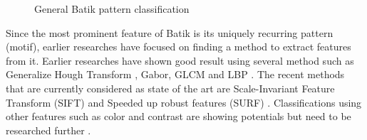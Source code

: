 \documentclass[conference, compsoc]{IEEEtran}
\begin{document}
\begin{figure}[!t]
\centering
{}
\hfil
{}
\hfil
{}
\hfil
{}
\hfil
{}
\caption{General Batik pattern classification}
\label{fig_batik_motifs}
\end{figure}

Since the most prominent feature of Batik is its uniquely recurring pattern (motif), earlier researches have focused on finding a method to extract features from it. Earlier researches have shown good result using several method such as Generalize Hough Transform \cite{sanabila2009recognition}, Gabor, GLCM and LBP \cite{fahmi2016feature}. The recent methods that are currently considered as state of the art are Scale-Invariant Feature Transform (SIFT) \cite{azhar2015batik} \cite{nurhaida2015automatic} and Speeded up robust features (SURF) \cite{willy2013evaluation}. Classifications using other features such as color and contrast are showing potentials but need to be researched further \cite{moertini2005algorithms}.
\end{document}
